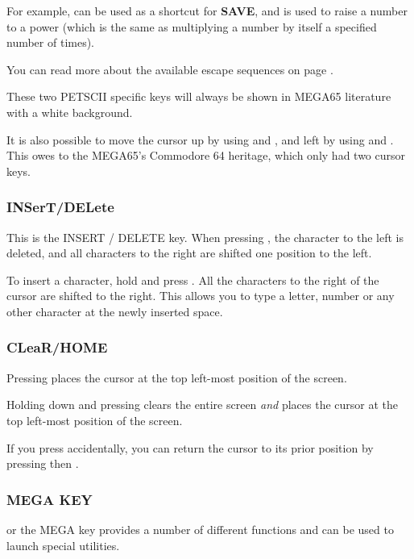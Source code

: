 For example, \megakeywhite{$\leftarrow$} can be used as a shortcut for {\bf SAVE}, and \megakeywhite{$\uparrow$} is used to raise a number to a power (which is the same as multiplying a number by itself a specified number of times).

You can read more about the available escape sequences on page \pageref{escape-sequences}.

These two PETSCII specific keys will always be shown in MEGA65 literature with a white background.

It is also possible to move the cursor up by using  and \megakey{$\downarrow$}, and left by using  and \megakey{$\rightarrow$}. This owes to the MEGA65's Commodore 64 heritage, which only had two cursor keys.

\subsubsection{INSerT/DELete}
This is the INSERT / DELETE key. When pressing , the character to the left is deleted, and all characters to the right are shifted one position to the left.

To insert a character, hold  and press . All the characters to the right of the cursor are shifted to the right. This allows you to type a letter, number or any other character at the newly inserted space.


\subsubsection{CLeaR/HOME}
Pressing  places the cursor at the top left-most position of the screen.

Holding down  and pressing  clears the entire screen {\it and} places the cursor at the top left-most position of the screen.

If you press  accidentally, you can return the cursor to its prior position by pressing  then .

\subsubsection{MEGA KEY}
\megasymbolkey or the MEGA key provides a number of different functions and can be used to launch special utilities.


